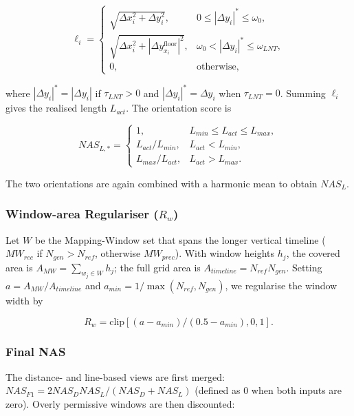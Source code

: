 \documentclass[main.tex]{subfiles}
\begin{document}
\begin{equation}
\ell_i = \begin{cases}
\sqrt{\Delta x_i^2 + \Delta y_i^2}, & 0 \leq |\Delta y_i|^* \leq \omega_0, \\
\sqrt{\Delta x_i^2 + |\Delta y_{x_i}^{\text{floor}}|^2}, & \omega_0 < |\Delta y_i|^* \leq \omega_{LNT}, \\
0, & \text{otherwise},
\end{cases}
\end{equation}

where $|\Delta y_i|^* = |\Delta y_i|$ if $\tau_{LNT} > 0$ and $|\Delta y_i|^* = \Delta y_i$ when $\tau_{LNT} = 0$. Summing $\ell_i$ gives the realised length $L_{act}$. The orientation score is

\begin{equation}
NAS_{L,*} = \begin{cases}
1, & L_{min} \leq L_{act} \leq L_{max}, \\
L_{act}/L_{min}, & L_{act} < L_{min}, \\
L_{max}/L_{act}, & L_{act} > L_{max}.
\end{cases}
\end{equation}

The two orientations are again combined with a harmonic mean to obtain $NAS_L$.

\subsubsection{Window-area Regulariser ($R_w$)}
Let $W$ be the Mapping-Window set that spans the longer vertical timeline ($MW_{rec}$ if $N_{gen} > N_{ref}$, otherwise $MW_{prec}$). With window heights $h_j$, the covered area is $A_{MW} = \sum_{w_j \in W} h_j$; the full grid area is $A_{timeline} = N_{ref} N_{gen}$. Setting $a = A_{MW}/A_{timeline}$ and $a_{min} = 1/\max(N_{ref}, N_{gen})$, we regularise the window width by

\begin{equation}
R_w = \text{clip}[(a - a_{min})/(0.5 - a_{min}), 0, 1].
\end{equation}

\subsubsection{Final NAS}
The distance- and line-based views are first merged: $NAS_{F1} = 2 NAS_D NAS_L/(NAS_D + NAS_L)$ (defined as 0 when both inputs are zero). Overly permissive windows are then discounted:
\end{document}
